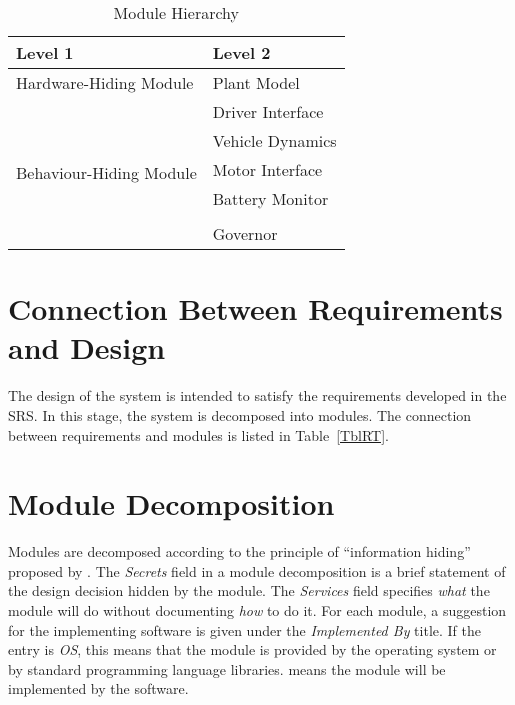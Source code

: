 \documentclass[12pt, titlepage]{article}
\begin{document}
\begin{table}[h!]
\centering
\begin{tabular}{p{} p{}}
\toprule
\textbf{Level 1} & \textbf{Level 2}\\
\midrule

{Hardware-Hiding Module} & Plant Model \\
\midrule

\multirow{7}{0.3\textwidth}{Behaviour-Hiding Module} & Driver Interface\\
& Vehicle Dynamics\\
& Motor Interface\\
& Battery Monitor\\
\midrule

\multirow{3}{0.3\textwidth}{Software Decision Module} & \\
& Governor\\
\bottomrule

\end{tabular}
\caption{Module Hierarchy}
\label{TblMH}
\end{table}

\section{Connection Between Requirements and Design} \label{SecConnection}

The design of the system is intended to satisfy the requirements developed in
the SRS. In this stage, the system is decomposed into modules. The connection
between requirements and modules is listed in Table~\ref{TblRT}.

\section{Module Decomposition} \label{SecMD}

Modules are decomposed according to the principle of ``information hiding''
proposed by \citet{ParnasEtAl1984}. The \emph{Secrets} field in a module
decomposition is a brief statement of the design decision hidden by the
module. The \emph{Services} field specifies \emph{what} the module will do
without documenting \emph{how} to do it. For each module, a suggestion for the
implementing software is given under the \emph{Implemented By} title. If the
entry is \emph{OS}, this means that the module is provided by the operating
system or by standard programming language libraries.  \emph{\progname{}} means the
module will be implemented by the \progname{} software.
\end{document}
